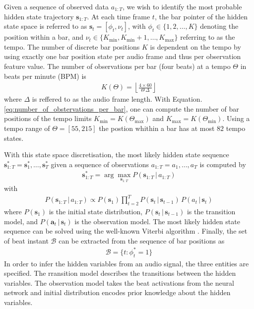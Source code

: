 \documentclass{scrartcl}
\begin{document}
Given a sequence of observed data $a_{1:T}$, we wish to identify the most probable hidden state trajectory $\mathbf s_{1:T}$. At each time frame $t$, the bar pointer of the hidden state space is referred to as $\mathbf s_t = [\phi_t, \nu_t]$, with $\phi_t \in \{1, 2, \dots, K\}$ denoting the position within a bar, and $\nu_t \in \{ K_{\text{min}}, K_{\text{min}}+1, \dots, K_{\text{max}}\}$ referring to as the tempo. The number of discrete bar positions $K$ is dependent on the tempo by using exactly one bar position state per audio frame and thus per observation feature value. The number of observations per bar (four beats) at a tempo $\Theta$ in beats per minute (BPM) is
\begin{align}
K(\Theta) = \left\lfloor \frac{4 \times 60}{\Theta \, \Delta} \right\rfloor 
\label{eq:number_of_obstervations_per_bar}
\end{align} 
where $\Delta$ is reffered to as the audio frame length. With Equation. \ref{eq:number_of_obstervations_per_bar}, one can compute the number of bar positions of the tempo limits $K_\text{min} = K(\Theta_\text{max})$ and $K_\text{max} =K(\Theta_\text{min})$. Using a tempo range of  $\Theta = [55, 215]$ the postion whithin a bar has at most $82$ tempo states.

With this state space discretisation, the most likely hidden state sequence $\mathbf s_{1:T}^* = \mathbf s_1^*, \dots, \mathbf s_T^*$ given a sequence of observations $a_{1:T} = a_1, \dots, a_T$ is computed by
\begin{align}
\mathbf s_{1:T}^* = \arg \max_{\mathbf s_{1:T}} P(\mathbf s_{1:T}\,|\, a_{1:T})
\label{eq:most_likely_states}
\end{align} 
with 
\begin{align}
 P(\mathbf s_{1:T}\,|\, a_{1:T}) \propto P(\mathbf s_1) \prod_{t=2}^T P(\mathbf s_t\,|\,\mathbf s_{t-1})\, P( a_t\,|\,\mathbf s_{t})
\end{align} 
where $P(\mathbf s_1)$ is the initial state distribution, $P(\mathbf s_t\,|\,\mathbf s_{t-1})$ is the transition model, and $P(\mathbf a_t\,|\,\mathbf s_{t})$ is the observation model. The most likely hidden state sequence can be solved using the well-known Viterbi algorithm \cite{Viterbi1967}. Finally, the set of beat instant $\mathcal B$ can be extracted from the sequence of bar positions as
\begin{align}
\mathcal B = \{ t: \phi_t^*=1\}
\end{align} 
In order to infer the hidden variables from an audio signal, the three entities are specified. The rransition model describes the transitions between the hidden variables. The observation model takes the beat activations from the neural network
and initial distribution encodes prior knowledge about the hidden variables.
\end{document}
